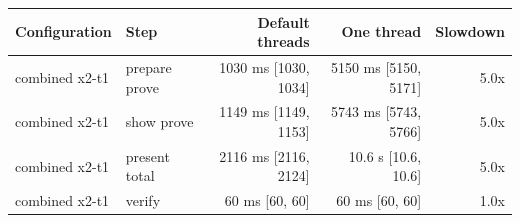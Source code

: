 \begin{tabular}{llrrr}
\toprule
Configuration & Step & Default threads & One thread & Slowdown \\
\midrule
combined x2-t1 & prepare prove & 1030 ms [1030, 1034] & 5150 ms [5150, 5171] & 5.0x \\
combined x2-t1 & show prove & 1149 ms [1149, 1153] & 5743 ms [5743, 5766] & 5.0x \\
combined x2-t1 & present total & 2116 ms [2116, 2124] & 10.6 s [10.6, 10.6] & 5.0x \\
combined x2-t1 & verify & 60 ms [60, 60] & 60 ms [60, 60] & 1.0x \\
\bottomrule
\end{tabular}
